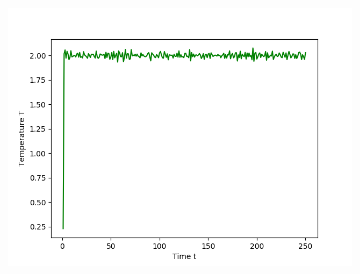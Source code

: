 \begin{figure}[ht]
\begin{subfigure}{0.3\textwidth}
\end{subfigure}
\hfill
\begin{subfigure}{0.3\textwidth}
\includegraphics[width=\textwidth]{../dat/Temperature_T2d0.png}
\end{subfigure}


\end{figure}
